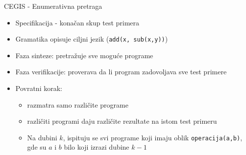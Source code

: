 \begin{frame}{CEGIS - Enumerativna pretraga}
    \begin{itemize}
        \item Specifikacija - konačan skup test primera
        \item Gramatika opisuje ciljni jezik (\texttt{add(x, sub(x,y))})
        \item Faza sinteze: pretražuje sve moguće programe
        \item Faza verifikacije: proverava da li program zadovoljava sve test primere
        \item Povratni korak: 
        \begin{itemize}
        	\item razmatra samo različite programe
        	\item različiti programi daju različite rezultate na istom test primeru
        	\item Na dubini $k$, ispituju se svi programe koji imaju oblik \texttt{operacija(a,b)}, gde su $a$ i $b$ bilo koji izrazi dubine $k-1$
        \end{itemize}
       
    \end{itemize}
\end{frame}
